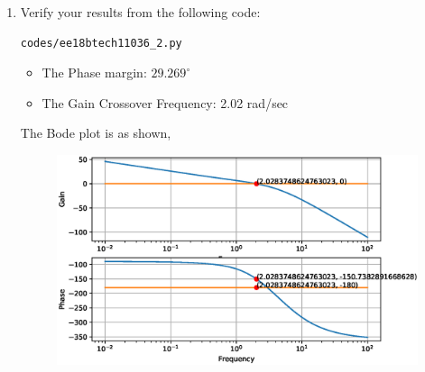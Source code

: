 \begin{enumerate}[label=\thesection.\arabic*.,ref=\thesection.\theenumi]
\begin{figure}[!ht]
    \centering
	\resizebox{\columnwidth}{!}{}
\caption{}
\label{fig:ee18btech11036}
\end{figure}


\item
Verify your results from the following code:
\begin{lstlisting}
codes/ee18btech11036_2.py
\end{lstlisting}
\begin{itemize}
    \item The Phase margin: $29.269^{\circ}$
    \item The Gain Crossover Frequency: 2.02 rad/sec
\end{itemize}
%
The Bode plot is as shown,
\begin{figure}[!h]
  \centering
  \includegraphics[width=\columnwidth]{./figs/ee18btech11036_2.eps}
  \caption{}
  \label{fig:ee18btech11036_2}
\end{figure}


\end{enumerate}
